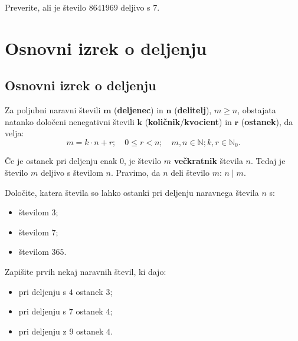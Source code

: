         \begin{naloga}
            Preverite, ali je število $8641 969$ deljivo s $7$.
            
        \end{naloga}
        
            
    

\newpage
\section{Osnovni izrek o deljenju}

        

            \subsection*{Osnovni izrek o deljenju}
                Za poljubni naravni števili $\mathbf{m}$ (\textbf{deljenec}) in $\mathbf{n}$ (\textbf{delitelj}), $m\geq n$, 
                obstajata natanko določeni nenegativni števili $\mathbf{k}$ (\textbf{količnik}/\textbf{kvocient}) in $\mathbf{r}$ (\textbf{ostanek}), 
                da velja:
                $$m=k\cdot n+r; \quad  0\leq r<n; \quad m,n\in\mathbb{N}; k,r\in\mathbb{N}_0.$$
            

            
                Če je ostanek pri deljenju enak $0$, je število $m$ \textbf{večkratnik} števila $n$. 
                Tedaj je število $m$ deljivo s številom $n$. Pravimo, da $n$ deli število $m$: $n\mid m$.
        

        
            \begin{naloga}
                Določite, katera števila so lahko ostanki pri deljenju naravnega števila $n$ s:
                \begin{itemize}
                    \item številom $3$; 
                    \item številom $7$; 
                    \item številom $365$. 
                \end{itemize}
            \end{naloga}

            \begin{naloga}
                Zapišite prvih nekaj naravnih števil, ki dajo:
                \begin{itemize}
                    \item pri deljenju s $4$ ostanek $3$; 
                    \item pri deljenju s $7$ ostanek $4$; 
                    \item pri deljenju z $9$ ostanek $4$. 
                \end{itemize}
            \end{naloga}
        

